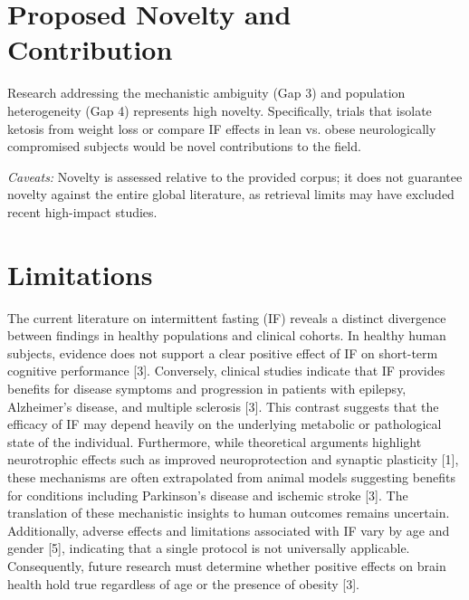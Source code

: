 \documentclass[11pt]{article}
\begin{document}
\section{Proposed Novelty and Contribution}
Research addressing the mechanistic ambiguity (Gap 3) and population heterogeneity (Gap 4) represents high novelty. Specifically, trials that isolate ketosis from weight loss or compare IF effects in lean vs. obese neurologically compromised subjects would be novel contributions to the field.

\textit{Caveats:} Novelty is assessed relative to the provided corpus; it does not guarantee novelty against the entire global literature, as retrieval limits may have excluded recent high-impact studies.

\section{Limitations}
The current literature on intermittent fasting (IF) reveals a distinct divergence between findings in healthy populations and clinical cohorts. In healthy human subjects, evidence does not support a clear positive effect of IF on short-term cognitive performance [3]. Conversely, clinical studies indicate that IF provides benefits for disease symptoms and progression in patients with epilepsy, Alzheimer's disease, and multiple sclerosis [3]. This contrast suggests that the efficacy of IF may depend heavily on the underlying metabolic or pathological state of the individual. Furthermore, while theoretical arguments highlight neurotrophic effects such as improved neuroprotection and synaptic plasticity [1], these mechanisms are often extrapolated from animal models suggesting benefits for conditions including Parkinson's disease and ischemic stroke [3]. The translation of these mechanistic insights to human outcomes remains uncertain. Additionally, adverse effects and limitations associated with IF vary by age and gender [5], indicating that a single protocol is not universally applicable. Consequently, future research must determine whether positive effects on brain health hold true regardless of age or the presence of obesity [3].
\end{document}
